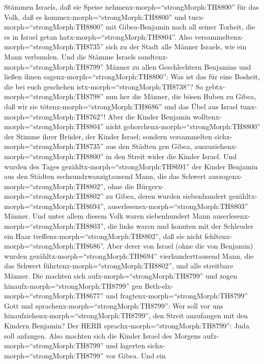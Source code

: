 Stämmen Israels, daß sie Speise nehmenx-morph=``strongMorph:TH8800'' für
das Volk, daß es kommex-morph=``strongMorph:TH8800'' und
tuex-morph=``strongMorph:TH8800'' mit Gibea-Benjamin nach all seiner
Torheit, die es in Israel getan hatx-morph=``strongMorph:TH8804''.
 Also versammeltenx-morph=``strongMorph:TH8735'' sich zu
der Stadt alle Männer Israels, wie ein Mann verbunden.  Und
die Stämme Israels sandtenx-morph=``strongMorph:TH8799'' Männer zu allen
Geschlechtern Benjamins und ließen ihnen
sagenx-morph=``strongMorph:TH8800'': Was ist das für eine Bosheit, die
bei euch geschehen istx-morph=``strongMorph:TH8738''?  So
gebtx-morph=``strongMorph:TH8798'' nun her die Männer, die bösen Buben
zu Gibea, daß wir sie tötenx-morph=``strongMorph:TH8686'' und das Übel
aus Israel tunx-morph=``strongMorph:TH8762''! Aber die Kinder Benjamin
wolltenx-morph=``strongMorph:TH8804'' nicht
gehorchenx-morph=``strongMorph:TH8800'' der Stimme ihrer Brüder, der
Kinder Israel;  sondern versammelten
sichx-morph=``strongMorph:TH8735'' aus den Städten gen Gibea,
auszuziehenx-morph=``strongMorph:TH8800'' in den Streit wider die Kinder
Israel.  Und wurden des Tages
gezähltx-morph=``strongMorph:TH8691'' der Kinder Benjamin aus den
Städten sechsundzwanzigtausend Mann, die das Schwert
auszogenx-morph=``strongMorph:TH8802'', ohne die
Bürgerx-morph=``strongMorph:TH8802'' zu Gibea, deren wurden
siebenhundert gezähltx-morph=``strongMorph:TH8694'',
auserlesenex-morph=``strongMorph:TH8803'' Männer.  Und
unter allem diesem Volk waren siebenhundert Mann
auserlesenx-morph=``strongMorph:TH8803'', die links waren und konnten
mit der Schleuder ein Haar treffenx-morph=``strongMorph:TH8802'', daß
sie nicht fehltenx-morph=``strongMorph:TH8686''.  Aber
derer von Israel (ohne die von Benjamin) wurden
gezähltx-morph=``strongMorph:TH8694'' vierhunderttausend Mann, die das
Schwert führtenx-morph=``strongMorph:TH8802'', und alle streitbare
Männer.  Die machten sich aufx-morph=``strongMorph:TH8799''
und zogen hinaufx-morph=``strongMorph:TH8799'' gen
Beth-elx-morph=``strongMorph:TH8677'' und
fragtenx-morph=``strongMorph:TH8799'' Gott und
sprachenx-morph=``strongMorph:TH8799'': Wer soll vor uns
hinaufziehenx-morph=``strongMorph:TH8799'', den Streit anzufangen mit
den Kindern Benjamin? Der HERR sprachx-morph=``strongMorph:TH8799'':
Juda soll anfangen.  Also machten sich die Kinder Israel
des Morgens aufx-morph=``strongMorph:TH8799'' und lagerten
sichx-morph=``strongMorph:TH8799'' vor Gibea.  Und ein

